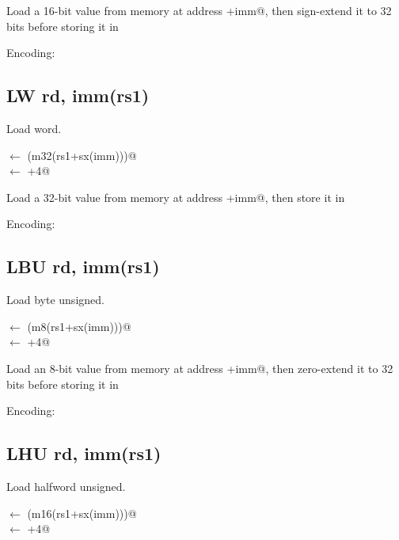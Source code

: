 Load a 16-bit value from memory at address +imm@, then 
sign-extend it to 32 bits before storing it in \verb@rd@


Encoding:


\subsection{LW rd, imm(rs1)}

Load word.

\verb@rd@ $\leftarrow$ \verb@sx(m32(rs1+sx(imm)))@\\
\verb@pc@ $\leftarrow$ \verb@pc+4@

Load a 32-bit value from memory at address +imm@, then 
store it in \verb@rd@

Encoding:



\subsection{LBU rd, imm(rs1)}

Load byte unsigned.

\verb@rd@ $\leftarrow$ \verb@zx(m8(rs1+sx(imm)))@\\
\verb@pc@ $\leftarrow$ \verb@pc+4@

Load an 8-bit value from memory at address +imm@, then 
zero-extend it to 32 bits before storing it in \verb@rd@

Encoding:


\subsection{LHU rd, imm(rs1)}

Load halfword unsigned.

\verb@rd@ $\leftarrow$ \verb@zx(m16(rs1+sx(imm)))@\\
\verb@pc@ $\leftarrow$ \verb@pc+4@

